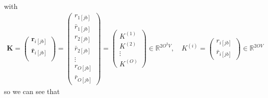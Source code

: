 with
\begin{align}
    \bm{K} = \begin{pmatrix}
\bm{r}_{i[jb]} \\
\bm{\bar{r}}_{i[{jb}]} \\
\end{pmatrix} = \begin{pmatrix}
r_{1[jb]} \\[6pt]
\bar{r}_{1[{j} b]} \\[6pt]
r_{2[jb]} \\[6pt]
\bar{r}_{2[{j} b]} \\[6pt]
\vdots \\[6pt]
r_{O[jb]} \\[6pt]
\bar{r}_{O[{j} b]}
\end{pmatrix} = \begin{pmatrix}
K^{(1)} \\[6pt]
K^{(2)} \\[6pt]
\vdots \\[6pt]
K^{(O)}
\end{pmatrix}\in \mathbb{R}^{2O^2V},
\quad
K^{(i)} = \begin{pmatrix}
r_{i[jb]} \\[3pt]
\bar{r}_{i[{j} b]}
\end{pmatrix} \in \mathbb{R}^{2OV}
\end{align} 
so we can see that
